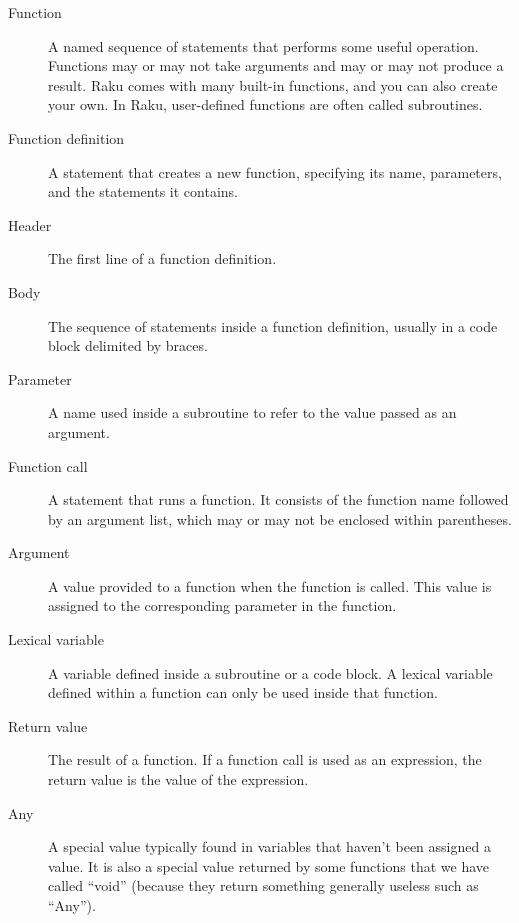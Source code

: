 \begin{description}

\item[Function] A named sequence of statements that performs 
some useful operation. Functions may or may not take arguments 
and may or may not produce a result. Raku comes with many 
built-in functions, and you can also create your own. In Raku, 
user-defined functions are often called subroutines.

\item[Function definition]  A statement that creates a new function,
specifying its name, parameters, and the statements it contains.

\item[Header] The first line of a function definition.

\item[Body] The sequence of statements inside a function 
definition, usually in a code block delimited by braces.

\item[Parameter] A name used inside a subroutine to refer to 
the value passed as an argument.

\item[Function call] A statement that runs a function. It
consists of the function name followed by an argument list, 
which may or may not be enclosed within parentheses.

\item[Argument]  A value provided to a function when the function is called.
This value is assigned to the corresponding parameter in the function.

\item[Lexical variable]  A variable defined inside a subroutine 
or a code block.  A lexical variable defined within a function can 
only be used inside that function.

\item[Return value]  The result of a function.  If a function call
is used as an expression, the return value is the value of
the expression.

\item[Any]  A special value typically found in variables that 
haven't been assigned a value. It is also a special value 
returned by some functions that we have called ``void'' (because 
they return something generally useless such as ``Any'').


\end{description}
